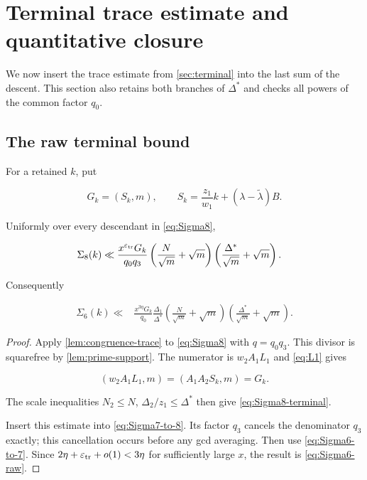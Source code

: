 \section{Terminal trace estimate and quantitative closure}
\label{sec:closure}

We now insert the trace estimate from \cref{sec:terminal} into the last sum
of the descent.  This section also retains both branches of $\Delta^*$ and
checks all powers of the common factor $q_0$.

\subsection{The raw terminal bound}

For a retained $k$, put

\begin{equation}\label{eq:Gk}
 G_k=(S_k,m),
 \qquad S_k=\frac{z_1}{w_1}k+(\lambda-\widetilde\lambda)B.
\end{equation}

\begin{lemma}
\label{lem:terminal-cancellation}
Uniformly over every descendant in \cref{eq:Sigma8},

\begin{align}
 \Sigma_8(k)
 \ll{}&
 \frac{x^{\varepsilon_{\rm tr}}G_k}{q_0q_3}
 \left(\frac N{\sqrt m}+\sqrt m\right)
 \left(\frac{\Delta^*}{\sqrt m}+\sqrt m\right).
 \label{eq:Sigma8-terminal}
\end{align}

Consequently

\begin{align}
 \Sigma_6(k)
 \ll{}&
 \frac{x^{3\eta}G_k}{q_0}
 \frac{\Delta_1}{\Delta^*}
 \left(\frac N{\sqrt m}+\sqrt m\right)
 \left(\frac{\Delta^*}{\sqrt m}+\sqrt m\right).
 \label{eq:Sigma6-raw}
\end{align}
\end{lemma}

\begin{proof}
Apply \cref{lem:congruence-trace} to \cref{eq:Sigma8} with
$q=q_0q_3$.  This divisor is squarefree by
\cref{lem:prime-support}.  The numerator is $w_2A_1L_1$ and
\cref{eq:L1} gives

\[
 (w_2A_1L_1,m)=(A_1A_2S_k,m)=G_k.
\]

The scale inequalities $N_2\le N$, $\Delta_2/z_1\le\Delta^*$ then give
\cref{eq:Sigma8-terminal}.

Insert this estimate into \cref{eq:Sigma7-to-8}.  Its factor $q_3$ cancels
the denominator $q_3$ exactly; this cancellation occurs before any gcd
averaging.  Then use \cref{eq:Sigma6-to-7}.  Since
$2\eta+\varepsilon_{\rm tr}+o(1)<3\eta$ for sufficiently large $x$, the result is
\cref{eq:Sigma6-raw}.
\end{proof}

